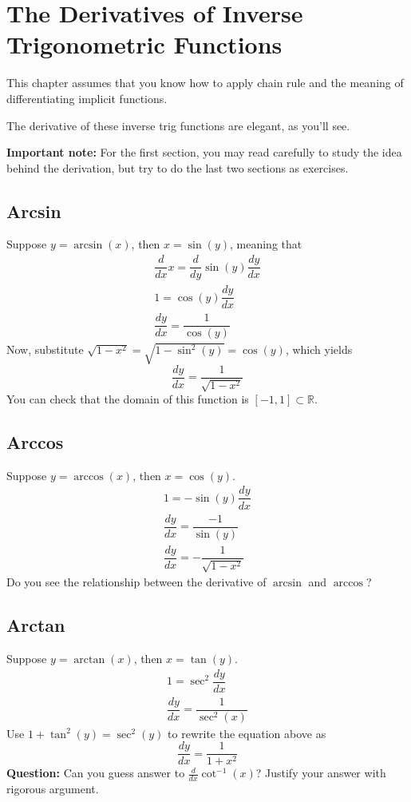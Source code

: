 \documentclass{article}
\theoremstyle{definition}
\theoremstyle{definition}
\theoremstyle{definition}
\theoremstyle{definition}
\theoremstyle{definition}
\theoremstyle{definition}
\theoremstyle{definition}
\theoremstyle{definition}
\theoremstyle{definition}
\begin{document}
\section{The Derivatives of Inverse Trigonometric Functions}
This chapter assumes that you know how to apply chain rule and the meaning of differentiating implicit functions.

The derivative of these inverse trig functions are elegant, as you'll see.

\textbf{Important note:} For the first section, you may read carefully to study the idea behind the derivation, but try to do the last two sections as exercises.
\subsection{Arcsin}
Suppose $y=\arcsin(x)$, then $x=\sin(y)$, meaning that 
\begin{align*}
    \dfrac{d}{dx}x=\dfrac{d}{dy}\sin(y)\dfrac{dy}{dx}\\
    1=\cos(y)\dfrac{dy}{dx}\\
    \dfrac{dy}{dx}=\dfrac{1}{\cos(y)}
\end{align*}
Now, substitute $\sqrt{1-x^2}=\sqrt{1-\sin^2(y)}=\cos(y)$, which yields
\[\dfrac{dy}{dx}=\dfrac{1}{\sqrt{1-x^2}}\]
You can check that the domain of this function is $[-1,1]\subset\mathbb{R}$.
\subsection{Arccos}
Suppose $y=\arccos(x)$, then $x=\cos(y)$.
\begin{align*}
    1=-\sin(y)\dfrac{dy}{dx}\\
    \dfrac{dy}{dx}=\dfrac{-1}{\sin(y)}\\
    \dfrac{dy}{dx}=-\dfrac{1}{\sqrt{1-x^2}}
\end{align*}
Do you see the relationship between the derivative of $\arcsin$ and $\arccos$?
\subsection{Arctan}
Suppose $y=\arctan(x)$, then $x=\tan(y)$.
\begin{align*}
    1=\sec^2\dfrac{dy}{dx}\\
    \dfrac{dy}{dx}=\dfrac{1}{\sec^2(x)}
\end{align*}
Use $1+\tan^2(y)=\sec^2(y)$ to rewrite the equation above as
\[\dfrac{dy}{dx}=\dfrac{1}{1+x^2}\]
\textbf{Question:} Can you guess answer to $\frac{d}{dx}\cot^{-1}(x)$? Justify your answer with rigorous argument.
\end{document}

